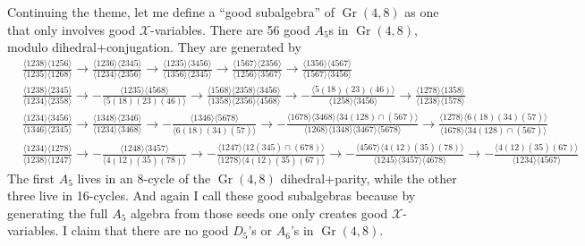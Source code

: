 \documentclass[12pt]{article}
\DeclareMathOperator{\Gr}{Gr}
\def\x{\mathcal{X}}
\begin{document}
Continuing the theme, let me define a ``good subalgebra'' of $\Gr(4,8)$ as one that only involves good $\x$-variables. There are 56 good $A_5$s in $\Gr(4,8)$, modulo dihedral+conjugation. They are generated by
{\tiny \begin{align}
	&\frac{\langle 1238\rangle  \langle 1256\rangle }{\langle
   1235\rangle  \langle 1268\rangle }\to \frac{\langle
   1236\rangle  \langle 2345\rangle }{\langle 1234\rangle
    \langle 2356\rangle }\to \frac{\langle 1235\rangle 
   \langle 3456\rangle }{\langle 1356\rangle  \langle
   2345\rangle }\to \frac{\langle 1567\rangle  \langle
   2356\rangle }{\langle 1256\rangle  \langle 3567\rangle
   }\to \frac{\langle 1356\rangle  \langle 4567\rangle
   }{\langle 1567\rangle  \langle 3456\rangle }\\
   &\frac{\langle 1238\rangle  \langle 2345\rangle
   }{\langle 1234\rangle  \langle 2358\rangle
   }\to-\frac{\langle 1235\rangle  \langle 4568\rangle
   }{\langle 5(18)(23)(46)\rangle }\to\frac{\langle
   1568\rangle  \langle 2358\rangle  \langle 3456\rangle
   }{\langle 1358\rangle  \langle 2356\rangle  \langle
   4568\rangle }\to-\frac{\langle 5(18)(23)(46)\rangle
   }{\langle 1258\rangle  \langle 3456\rangle
   }\to\frac{\langle 1278\rangle  \langle 1358\rangle
   }{\langle 1238\rangle  \langle 1578\rangle }\\
   &\frac{\langle 1234\rangle  \langle 3456\rangle
   }{\langle 1346\rangle  \langle 2345\rangle
   }\to\frac{\langle 1348\rangle  \langle 2346\rangle
   }{\langle 1234\rangle  \langle 3468\rangle
   }\to-\frac{\langle 1346\rangle  \langle 5678\rangle
   }{\langle 6(18)(34)(57)\rangle }\to-\frac{\langle
   1678\rangle  \langle 3468\rangle  \langle 34(128)\cap
   (567)\rangle }{\langle 1268\rangle  \langle
   1348\rangle  \langle 3467\rangle  \langle 5678\rangle
   }\to\frac{\langle 1278\rangle  \langle
   6(18)(34)(57)\rangle }{\langle 1678\rangle  \langle
   34(128)\cap (567)\rangle }\\
   &\frac{\langle 1234\rangle  \langle 1278\rangle
   }{\langle 1238\rangle  \langle 1247\rangle
   }\to-\frac{\langle 1248\rangle  \langle 3457\rangle
   }{\langle 4(12)(35)(78)\rangle }\to-\frac{\langle
   1247\rangle  \langle 12(345)\cap (678)\rangle
   }{\langle 1278\rangle  \langle 4(12)(35)(67)\rangle
   }\to-\frac{\langle 4567\rangle  \langle
   4(12)(35)(78)\rangle }{\langle 1245\rangle  \langle
   3457\rangle  \langle 4678\rangle }\to-\frac{\langle
   4(12)(35)(67)\rangle }{\langle 1234\rangle  \langle
   4567\rangle }
\end{align}}
The first $A_5$ lives in an 8-cycle of the $\Gr(4,8)$ dihedral+parity, while the other three live in 16-cycles. And again I call these good subalgebras because by generating the full $A_5$ algebra from those seeds one only creates good $\x$-variables. I claim that there are no good $D_5$'s or $A_6$'s in $\Gr(4,8)$. 
\end{document}
